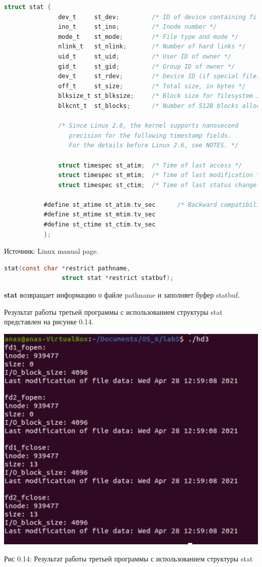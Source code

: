 \documentclass[12pt]{report}
\begin{document}
\begin{lstlisting}[language=C]
struct stat {
               dev_t     st_dev;         /* ID of device containing file */
               ino_t     st_ino;         /* Inode number */
               mode_t    st_mode;        /* File type and mode */
               nlink_t   st_nlink;       /* Number of hard links */
               uid_t     st_uid;         /* User ID of owner */
               gid_t     st_gid;         /* Group ID of owner */
               dev_t     st_rdev;        /* Device ID (if special file) */
               off_t     st_size;        /* Total size, in bytes */
               blksize_t st_blksize;     /* Block size for filesystem I/O */
               blkcnt_t  st_blocks;      /* Number of 512B blocks allocated */

               /* Since Linux 2.6, the kernel supports nanosecond
                  precision for the following timestamp fields.
                  For the details before Linux 2.6, see NOTES. */

               struct timespec st_atim;  /* Time of last access */
               struct timespec st_mtim;  /* Time of last modification */
               struct timespec st_ctim;  /* Time of last status change */

           #define st_atime st_atim.tv_sec      /* Backward compatibility */
           #define st_mtime st_mtim.tv_sec
           #define st_ctime st_ctim.tv_sec
           };

\end{lstlisting}

Источник: Linux manual page.

\begin{lstlisting}[language=C]
stat(const char *restrict pathname,
                struct stat *restrict statbuf);
 \end{lstlisting}               
\textbf{stat} возвращает информацию о файле pathname и заполняет буфер statbuf.

Результат работы третьей программы с использованием структуры stat представлен на рисунке 0.14.

\begin{center}
		\includegraphics[scale=0.55]{pics/Stat.png}
		
			Рис 0.14: Результат работы третьей программы с использованием структуры stat 
\end{center}
\end{document}
